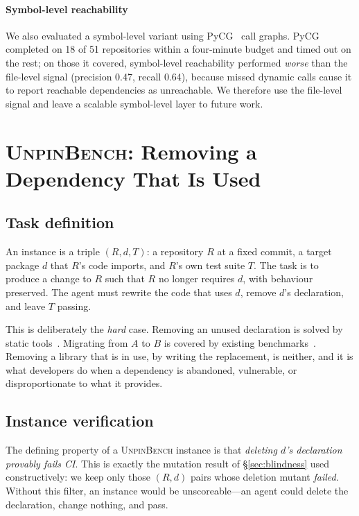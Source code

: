 \documentclass[10pt,conference]{IEEEtran}
\newcommand{\bench}{\textsc{UnpinBench}}
\begin{document}
\paragraph*{Symbol-level reachability} We also evaluated a symbol-level
variant using PyCG~\cite{pycg2021} call graphs. PyCG completed on 18 of
51 repositories within a four-minute budget and timed out on the rest; on
those it covered, symbol-level reachability performed \emph{worse} than
the file-level signal (precision 0.47, recall 0.64), because missed
dynamic calls cause it to report reachable dependencies as unreachable.
We therefore use the file-level signal and leave a scalable symbol-level
layer to future work.

\section{\bench: Removing a Dependency That Is Used}
\label{sec:benchmark}

\subsection{Task definition}

An instance is a triple $(R, d, T)$: a repository $R$ at a fixed commit,
a target package $d$ that $R$'s code imports, and $R$'s own test suite
$T$. The task is to produce a change to $R$ such that $R$ no longer
requires $d$, with behaviour preserved. The agent must rewrite the code
that uses $d$, remove $d$'s declaration, and leave $T$ passing.

This is deliberately the \emph{hard} case. Removing an unused declaration
is solved by static tools~\cite{pytrim2025,soto2021longitudinal}.
Migrating from $A$ to $B$ is covered by existing
benchmarks~\cite{pymigbench2023,migrationbench2025}. Removing a library
that is in use, by writing the replacement, is neither, and it is what
developers do when a dependency is abandoned, vulnerable, or
disproportionate to what it provides.

\subsection{Instance verification}

The defining property of a \bench{} instance is that \emph{deleting $d$'s
declaration provably fails CI}. This is exactly the mutation result of
\S\ref{sec:blindness} used constructively: we keep only those
$(R,d)$ pairs whose deletion mutant \emph{failed}. Without this filter,
an instance would be unscoreable---an agent could delete the declaration,
change nothing, and pass.
\end{document}
